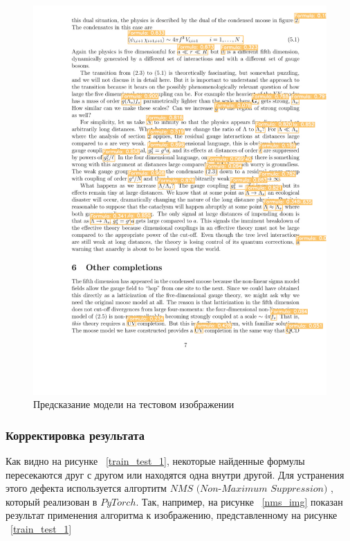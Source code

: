 \begin{figure}
    \includegraphics[scale=0.75]{img/train/test_2.png}
    \caption{Предсказание модели на тестовом изображении}
    \label{train_test_2}
\end{figure}

\subsubsection{Корректировка результата}
Как видно на рисунке ~\ref{train_test_1}, некоторые найденные формулы пересекаются друг с другом или находятся одна внутри другой. Для устранения этого дефекта используется алгортитм $\textit{NMS (Non-Maximum Suppression)}$ \cite{nms}, который реализован в $PyTorch$.
Так, например, на рисунке ~\ref{nms_img} показан результат применения алгоритма к изображению, представленному на рисунке ~\ref{train_test_1}

